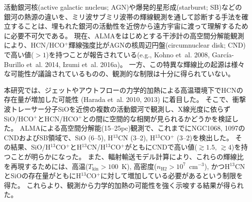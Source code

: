 \documentclass[ja]{2019b}
\begin{document}
活動銀河核(active galactic nucleus; AGN)や爆発的星形成(starburst; SB)などの銀河の熱源の違いを、ミリ波サブミリ波帯の輝線観測を通して診断する手法を確立することは、埋もれた銀河の活動性を近傍から遠方宇宙に渡って理解するために必要不可欠である。
現在、ALMAをはじめとする干渉計の高空間分解能観測により、HCN/HCO$^{+}$輝線強度比がAGNの核周辺円盤(circumnuclear disk; CND)で高い値($>1$)を持つことが報告されている(e.g., Kohno et~al. 2008, Garc\'{i}a-Burillo et~al. 2014, Izumi et~al. 2016a)。
一方、この特異な輝線比の起源は様々な可能性が議論されているものの、観測的な制限は十分に得られていない。

本研究では、ジェットやアウトフローの力学的加熱による高温環境下でHCNの存在量が増加した可能性 (Harada et~al. 2010, 2013) に着目した。
そこで、衝撃波トレーサー分子SiOを近傍の複数の活動銀河で観測し、X線光度に依らずSiO/HCO$^{+}$とHCN/HCO$^{+}$との間に空間的な相関が見られるかどうかを検証した。
ALMAによる高空間分解能(15--25pc)観測で、これまでにNGC1068, 1097のCNDおよびSB領域で、SiO (6--5), H$^{13}$CN (3--2), H$^{13}$CO$^{+}$ (3--2)を検出した。
その結果、SiO/H$^{13}$CO$^{+}$とH$^{13}$CN/H$^{13}$CO$^{+}$がともにCNDで高い値($\gtrsim1.5$, $\gtrsim4$)を持つことが明らかになった。
また、輻射輸送モデル計算により、これらの輝線比を再現するためには、高温($T_{\mathrm{kin}}>100$~K), 高密度($n_{\mathrm{H2}}>10^{7}$~cm$^{-3}$), かつH$^{13}$CNとSiOの存在量がともにH$^{13}$CO$^{+}$に対して増加している必要があるという制限を得た。
これらより、観測から力学的加熱の可能性を強く示唆する結果が得られた。
\end{document}

